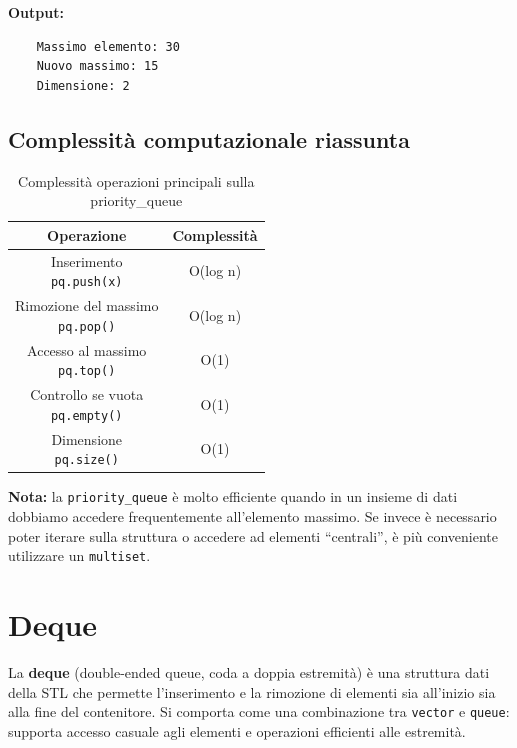 \textbf{Output:}
\begin{verbatim}
	Massimo elemento: 30
	Nuovo massimo: 15
	Dimensione: 2
\end{verbatim}

\subsection{Complessità computazionale riassunta}

\begin{table}[h!]
	\centering
	\renewcommand{\arraystretch}{1.5}
	\setlength{\tabcolsep}{12pt}
	\begin{tabular}{|c|c|}
		\hline
		\textbf{Operazione} & \textbf{Complessità} \\
		\hline
		\makecell{Inserimento \\ \texttt{pq.push(x)}} & O(log n) \\
		\hline
		\makecell{Rimozione del massimo \\ \texttt{pq.pop()}} & O(log n) \\
		\hline
		\makecell{Accesso al massimo \\ \texttt{pq.top()}} & O(1) \\
		\hline
		\makecell{Controllo se vuota \\ \texttt{pq.empty()}} & O(1) \\
		\hline
		\makecell{Dimensione \\ \texttt{pq.size()}} & O(1) \\
		\hline
	\end{tabular}
	\caption{Complessità operazioni principali sulla priority\_queue}
	\label{tab:strutture-dati:priority_queue:complessita}
\end{table}


\textbf{Nota:} la \texttt{priority\_queue} è molto efficiente quando in un insieme di dati dobbiamo accedere frequentemente all'elemento massimo. Se invece è necessario poter iterare sulla struttura o accedere ad elementi “centrali”, è più conveniente utilizzare un \texttt{multiset}.




\newpage
\section{Deque}

La \textbf{deque} (double-ended queue, coda a doppia estremità) è una struttura dati della STL che permette l'inserimento e la rimozione di elementi sia all'inizio sia alla fine del contenitore.  
Si comporta come una combinazione tra \texttt{vector} e \texttt{queue}: supporta accesso casuale agli elementi e operazioni efficienti alle estremità.

